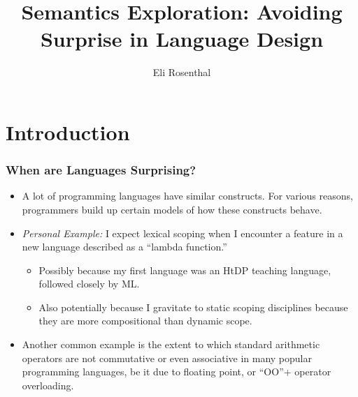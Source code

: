 \documentclass{beamer}
\title{Semantics Exploration: Avoiding Surprise in Language Design}
\author{Eli Rosenthal}
\begin{document}
{%
  \frame{\titlepage}
}

\tableofcontents

\section{Introduction}
\begin{frame}
  \frametitle{When are Languages Surprising?}
  
  \begin{itemize}
  \item A lot of programming languages have similar constructs. For various
    reasons, programmers build up certain models of how these constructs behave.
    \pause
  \item \emph{Personal Example:} I expect lexical scoping when I encounter a feature in a
    new language described as a ``lambda function.''
    \begin{itemize}
    \item Possibly because my first language was an HtDP teaching language,
      followed closely by ML.
    \item Also potentially because I gravitate to static scoping disciplines because
      they are more compositional than dynamic scope.
    \end{itemize}
    \pause
  \item Another common example is the extent to which standard arithmetic
    operators are not commutative or even associative in many popular
    programming languages, be it due to floating point, or ``OO''$+$ operator overloading.

\end{itemize}

\end{frame}
\end{document}
